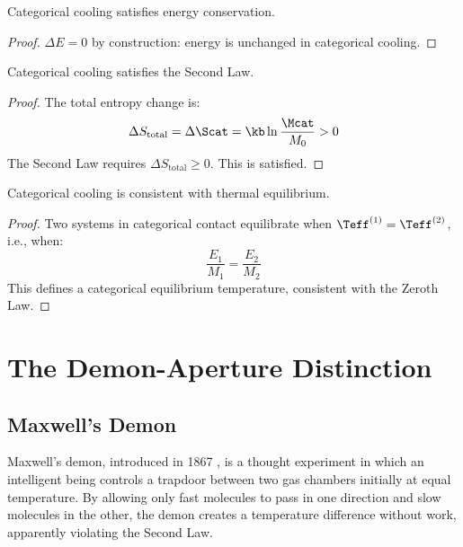 \begin{proposition}
Categorical cooling satisfies energy conservation.
\end{proposition}

\begin{proof}
$\Delta E = 0$ by construction: energy is unchanged in categorical cooling.
\end{proof}

\begin{proposition}
Categorical cooling satisfies the Second Law.
\end{proposition}

\begin{proof}
The total entropy change is:
\begin{equation}
\Delta S_{\text{total}} = \Delta \Scat = \kb \ln \frac{\Mcat}{M_0} > 0
\end{equation}
The Second Law requires $\Delta S_{\text{total}} \geq 0$. This is satisfied.
\end{proof}

\begin{proposition}
Categorical cooling is consistent with thermal equilibrium.
\end{proposition}

\begin{proof}
Two systems in categorical contact equilibrate when $\Teff^{(1)} = \Teff^{(2)}$, i.e., when:
\begin{equation}
\frac{E_1}{M_1} = \frac{E_2}{M_2}
\end{equation}
This defines a categorical equilibrium temperature, consistent with the Zeroth Law.
\end{proof}

\section{The Demon-Aperture Distinction}

\subsection{Maxwell's Demon}

Maxwell's demon, introduced in 1867 \cite{maxwell1867}, is a thought experiment in which an intelligent being controls a trapdoor between two gas chambers initially at equal temperature. By allowing only fast molecules to pass in one direction and slow molecules in the other, the demon creates a temperature difference without work, apparently violating the Second Law.

